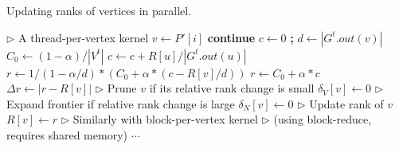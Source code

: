 \begin{algorithm}[!hbt]
\caption{Updating ranks of vertices in parallel.}
\label{alg:update}
\begin{algorithmic}[1]

\Statex

  \State $\rhd$ A thread-per-vertex kernel
  \ForAll{$i \in [0, N'_P)$ \textbf{in parallel$_{thread/V}$}}
    \State $v \gets P'[i]$
     \textbf{continue}
    \EndIf
      \State $c \gets 0$ \textbf{;} $d \gets |G^t.out(v)|$
      \State $C_0 \gets (1 - \alpha)/|V^t|$
        \State $c \gets c + R[u] / |G^t.out(u)|$
      \EndFor
       \label{alg:frontier--formula-begin}
        \State $r \gets 1/(1 - \alpha/d) * (C_0 + \alpha * (c - R[v]/d))$
      \Else
        \State $r \gets C_0 + \alpha * c$
      \EndIf \label{alg:frontier--formula-end}
      \State $\Delta r \gets |r - R[v]|$
      \State $\rhd$ Prune $v$ if its relative rank change is small
        \State $\delta_V[v] \gets 0$
      \EndIf
      \State $\rhd$ Expand frontier if relative rank change is large
       \label{alg:frontier--remark-begin}
        \State $\delta_N[v] \gets 0$
      \EndIf
      \State $\rhd$ Update rank of $v$
      \State $R[v] \gets r$
  \EndFor
  \State $\rhd$ Similarly with block-per-vertex kernel
  \State $\rhd$ (using block-reduce, requires shared memory)
  \ForAll{$i \in [N'_P, |V^t|)$ \textbf{in parallel$_{block/V}$}}
    \State $\cdots$
  \EndFor
\EndFunction
\end{algorithmic}
\end{algorithm}
